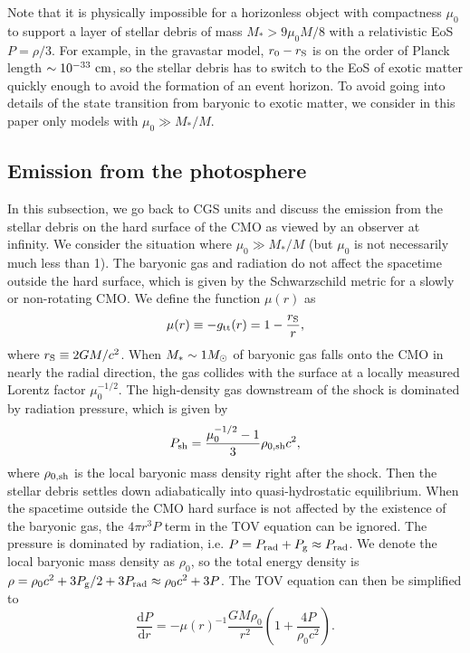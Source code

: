 \documentclass[useAMS,usenatbib]{mn2e}
\def\d{{\mathrm{d}}}
\begin{document}
Note that it is physically impossible for a horizonless
object with compactness $\mu_0$ to support a layer of stellar debris
of mass 
$M_*>9\mu_0M/8$ with a relativistic EoS $P = \rho/3$. For example, in
the gravastar model, $r_0 - r_{\rm S}$ is on the order of Planck length
$\sim 10^{-33}\rm\ cm$, so the stellar debris has
to switch to the EoS of exotic matter quickly enough to avoid the
formation of an event horizon. To avoid going into details of the
state transition from baryonic to exotic matter, we consider
in this paper only models with $\mu_0\gg M_*/M$.

\subsection{Emission from the photosphere}\label{sec:emission}

In this subsection, we go back to CGS units and discuss the
emission from the stellar debris on the hard surface of the CMO as
viewed by an observer at infinity. We consider the
situation where $\mu_0\gg M_*/M$ (but $\mu_0$ is not necessarily much 
less than 1). The baryonic gas and radiation do not affect the
spacetime outside the hard surface, which is given by the
Schwarzschild metric for a slowly or non-rotating CMO. We define the
function $\mu(r)$ as 
\begin{equation}
  \label{eq:8}
  \mu(r) \equiv -g_{\rm tt}(r) = 1 - \frac{r_{\rm S}}{r},
\end{equation}
where $r_{\rm S}\equiv 2GM/c^2$. When $M_*\sim 1 M_{\rm \odot}$ of
baryonic gas falls onto the CMO in nearly the radial direction, the
gas collides with the 
surface at a locally measured Lorentz factor $\mu_0^{-1/2}$. The
high-density gas downstream of the shock is dominated by radiation
pressure, which is given by
\begin{equation}
  \label{eq:28}
  P_{\rm sh} = \frac{\mu_0^{-1/2} - 1}{3} \rho_{\rm 0, sh}c^2,
\end{equation}
where $\rho_{\rm 0, sh}$ is the local baryonic mass density right after
the shock. Then the stellar debris settles down adiabatically into
quasi-hydrostatic equilibrium. When the spacetime outside the CMO hard
surface is not affected by the existence of the baryonic gas, the
$4\pi r^3 P$ term in the TOV equation can be ignored. The pressure is
dominated by radiation, i.e. $P = P_{\rm rad} + P_{\rm g} \approx
P_{\rm rad}$. We denote the local baryonic mass density as $\rho_0$,
so the total energy density is $\rho = \rho_0 c^2 + 3P_{\rm g}/2 +
3P_{\rm rad}\approx \rho_0 c^2 + 3P$. The TOV equation
can then be simplified to
\begin{equation}
  \label{eq:7}
  \frac{\d P}{\d r} = -\mu(r)^{-1} \frac{GM \rho_0}{r^2} \left(1 +
    \frac{4P}{\rho_0 c^2} \right).
\end{equation}
\end{document}
